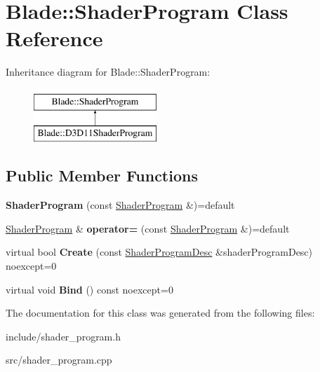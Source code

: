 \hypertarget{class_blade_1_1_shader_program}{}\section{Blade\+:\+:Shader\+Program Class Reference}
\label{class_blade_1_1_shader_program}
Inheritance diagram for Blade\+:\+:Shader\+Program\+:\begin{figure}[H]
\begin{center}
\leavevmode
\includegraphics[height=2.000000cm]{class_blade_1_1_shader_program}
\end{center}
\end{figure}
\subsection*{Public Member Functions}
\begin{DoxyCompactItemize}
\item 
\mbox{\label{class_blade_1_1_shader_program_a8d7453ddbb33f55af0bdc8deeb822560}} 
{\bfseries Shader\+Program} (const \hyperlink{class_blade_1_1_shader_program}{Shader\+Program} \&)=default
\item 
\mbox{\label{class_blade_1_1_shader_program_a4523ce6c51b414a9a5648eed51b3975c}} 
\hyperlink{class_blade_1_1_shader_program}{Shader\+Program} \& {\bfseries operator=} (const \hyperlink{class_blade_1_1_shader_program}{Shader\+Program} \&)=default
\item 
\mbox{\label{class_blade_1_1_shader_program_af0a3a04d13e11d7ace44076c6346703e}} 
virtual bool {\bfseries Create} (const \hyperlink{struct_blade_1_1_shader_program_desc}{Shader\+Program\+Desc} \&shader\+Program\+Desc) noexcept=0
\item 
\mbox{\label{class_blade_1_1_shader_program_a826f4a4372ee7ba04d22e4bc4ee76d98}} 
virtual void {\bfseries Bind} () const noexcept=0
\end{DoxyCompactItemize}


The documentation for this class was generated from the following files\+:\begin{DoxyCompactItemize}
\item 
include/shader\+\_\+program.\+h\item 
src/shader\+\_\+program.\+cpp\end{DoxyCompactItemize}
